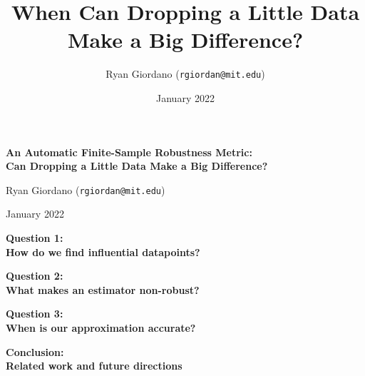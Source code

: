 \documentclass[10pt]{beamer}
\title{When Can Dropping a Little Data Make a Big Difference?}
\author{Ryan Giordano (\texttt{rgiordan@mit.edu})}
\date{January 2022}
\begin{document}

\begin{frame}

\begin{center}
\large
\textbf{
An Automatic Finite-Sample Robustness Metric:
\\Can Dropping a Little Data Make a Big Difference?}
\end{center}

\hrulefill

Ryan Giordano (\texttt{rgiordan@mit.edu})\footnotemark[1]

January 2022


\end{frame}



\begin{frame}{}

{\Large \textbf{Question 1:} \\ \vspace{0.5em}
\textbf{How do we find influential datapoints?}}

\end{frame}

% 

\begin{frame}{}

{\Large \textbf{Question 2:} \\ \vspace{0.5em}
\textbf{What makes an estimator non-robust?}}

\end{frame}

% 

\begin{frame}{}

{\Large \textbf{Question 3:} \\ \vspace{0.5em}
\textbf{When is our approximation accurate?}}

\end{frame}

% 

\begin{frame}{}

{\Large \textbf{Conclusion: \\Related work and future directions} }

\end{frame}
\end{document}
